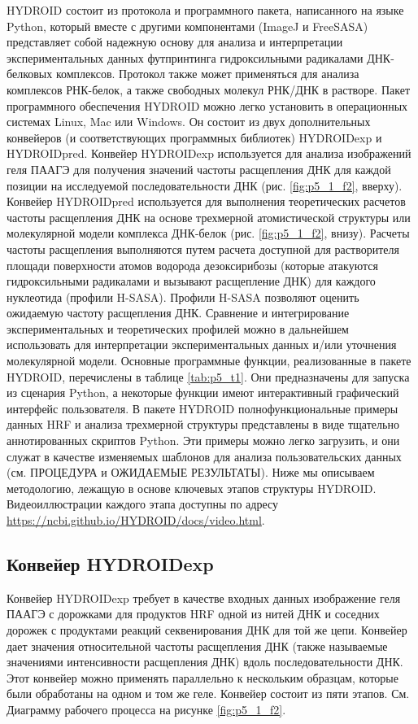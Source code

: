    HYDROID состоит из протокола и программного пакета, написанного на языке Python, который вместе с другими компонентами (ImageJ и FreeSASA) представляет собой надежную основу для анализа и интерпретации экспериментальных данных футпринтинга гидроксильными радикалами ДНК-белковых комплексов. Протокол также может применяться для анализа комплексов РНК-белок, а также свободных молекул РНК/ДНК в растворе. Пакет программного обеспечения HYDROID можно легко установить в операционных системах Linux, Mac или Windows. Он состоит из двух дополнительных конвейеров (и соответствующих программных библиотек) HYDROIDexp и HYDROIDpred. Конвейер HYDROIDexp используется для анализа изображений геля ПААГЭ для получения значений частоты расщепления ДНК для каждой позиции на исследуемой последовательности ДНК (рис. \ref{fig:p5_1_f2}, вверху). Конвейер HYDROIDpred используется для выполнения теоретических расчетов частоты расщепления ДНК на основе трехмерной атомистической структуры или молекулярной модели комплекса ДНК-белок (рис. \ref{fig:p5_1_f2}, внизу). Расчеты частоты расщепления выполняются путем расчета доступной для растворителя площади поверхности атомов водорода дезоксирибозы (которые атакуются гидроксильными радикалами и вызывают расщепление ДНК) для каждого нуклеотида (профили H-SASA). Профили H-SASA позволяют оценить ожидаемую частоту расщепления ДНК. Сравнение и интегрирование экспериментальных и теоретических профилей можно в дальнейшем использовать для интерпретации экспериментальных данных и/или уточнения молекулярной модели. Основные программные функции, реализованные в пакете HYDROID, перечислены в таблице \ref{tab:p5_t1}. Они предназначены для запуска из сценария Python, а некоторые функции имеют интерактивный графический интерфейс пользователя. В пакете HYDROID полнофункциональные примеры данных HRF и анализа трехмерной структуры представлены в виде тщательно аннотированных скриптов Python. Эти примеры можно легко загрузить, и они служат в качестве изменяемых шаблонов для анализа пользовательских данных (см. ПРОЦЕДУРА и ОЖИДАЕМЫЕ РЕЗУЛЬТАТЫ). Ниже мы описываем методологию, лежащую в основе ключевых этапов структуры HYDROID. Видеоиллюстрации каждого этапа доступны по адресу \url{https://ncbi.github.io/HYDROID/docs/video.html}.

\subsection{Конвейер HYDROIDexp}
 Конвейер HYDROIDexp требует в качестве входных данных изображение геля ПААГЭ с дорожками для продуктов HRF одной из нитей ДНК и соседних дорожек с продуктами реакций секвенирования ДНК для той же цепи. Конвейер дает значения относительной частоты расщепления ДНК (также называемые значениями интенсивности расщепления ДНК) вдоль последовательности ДНК. Этот конвейер можно применять параллельно к нескольким образцам, которые были обработаны на одном и том же геле. Конвейер состоит из пяти этапов. См. Диаграмму рабочего процесса на рисунке \ref{fig:p5_1_f2}.


